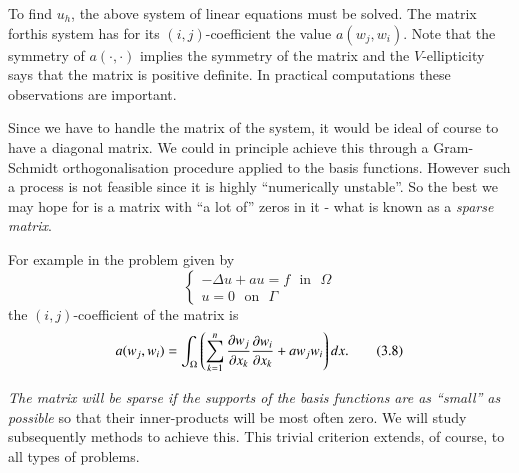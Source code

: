 To find $u_{h}$, the above system of linear equations must be
solved. The matrix for\pageoriginale this system has for its
$(i,j)$-coefficient the value $a(w_{j},w_{i})$. Note that the symmetry
of $a(\cdot,\cdot)$ implies the symmetry of the matrix and the
$V$-ellipticity says that the matrix is positive definite. In
practical computations these observations are important.

Since we have to handle the matrix of the system, it would be ideal of
course to have a diagonal matrix. We could in principle achieve this
through a Gram-Schmidt orthogonalisation procedure applied to the
basis functions. However such a process is not feasible since it is
highly ``numerically unstable''. So the best we may hope for is a
matrix with ``a lot of'' zeros in it - what is known as a {\em sparse
  matrix}.

For example in the problem given by
$$
\begin{cases}
-\Delta u+au=f\text{~ in~ }\Omega\\
u=0\text{~ on~ } \Gamma
\end{cases}
$$
the $(i,j)$-coefficient of the matrix is
\begin{equation*}
a(w_{j},w_{i})=\int_{\Omega}\left(\sum^{n}_{k=1}\frac{\partial w_{j}}{\partial
  x_{k}}\frac{\partial w_{i}}{\partial
  x_{k}}+aw_{j}w_{i}\right)dx.\tag{3.8}\label{chap3-eq3.8} 
\end{equation*}

{\em The matrix will be sparse if the supports of the basis functions
  are as ``small'' as possible} so that their inner-products will be
most often zero. We will study subsequently methods to achieve
this. This trivial criterion extends, of course, to all types of
problems. 
